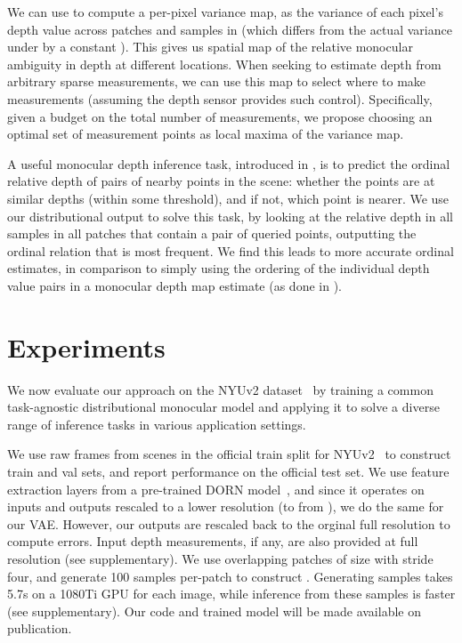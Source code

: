 \documentclass[10pt,twocolumn,letterpaper]{article}
\begin{document}
 We can use  to compute a per-pixel variance map,  as the variance of each pixel's depth value across patches and samples in  (which differs from the actual variance under  by a constant ). This gives us spatial map of the relative monocular ambiguity in depth at different locations. When seeking to estimate depth from arbitrary sparse measurements, we can use this map to select where to make measurements (assuming the depth sensor provides such control). Specifically, given a budget on the total number of measurements, we propose choosing an optimal set of measurement points as local maxima of the variance map.

 A useful monocular depth inference task, introduced in \cite{zoran2015learning}, is to predict the ordinal relative depth of pairs of nearby points in the scene: whether the points are at similar depths (within some threshold), and if not, which point is nearer. We use our distributional output to solve this task, by looking at the relative depth in all samples in all patches that contain a pair of queried points, outputting the ordinal relation that is most frequent. We find this leads to more accurate ordinal estimates, in comparison to simply using the ordering of the individual depth value pairs in a monocular depth map estimate (as done in \cite{chen2016single,zoran2015learning}). 

\section{Experiments}
\label{sec:apps}

We now evaluate our approach on the NYUv2 dataset~\cite{silberman2012indoor} by training a common task-agnostic distributional monocular model and applying it to solve a diverse range of inference tasks in various application settings.

 We use raw frames from scenes in the official train split for NYUv2~\cite{silberman2012indoor} to construct train and val sets, and report performance on the official test set. We use feature extraction layers from a pre-trained DORN model~\cite{fu2018deep}, and since it operates on inputs and outputs rescaled to a lower resolution (to  from ), we do the same for our VAE. However, our outputs are rescaled back to the orginal full resolution to compute errors. Input depth measurements, if any, are also provided at full resolution (see supplementary). We use overlapping patches of size  with stride four, and generate 100 samples per-patch to construct . Generating samples takes 5.7s on a 1080Ti GPU for each image, while inference from these samples is faster (see supplementary). Our code and trained model will be made available on publication.
\end{document}
